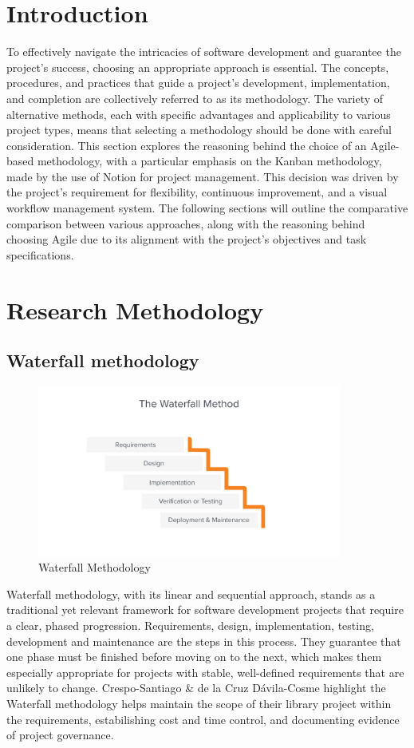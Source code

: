 \section{Introduction}
To effectively navigate the intricacies of software development and guarantee the project's success, choosing an appropriate approach is essential.
The concepts, procedures, and practices that guide a project's development, implementation, and completion are collectively referred to as its methodology.
The variety of alternative methods, each with specific advantages and applicability to various project types, means that selecting a methodology should be done with careful consideration.
This section explores the reasoning behind the choice of an Agile-based methodology, with a particular emphasis on the Kanban methodology, made by the use of Notion for project management.
This decision was driven by the project's requirement for flexibility, continuous improvement, and a visual workflow management system. 
The following sections will outline the comparative comparison between various approaches, along with the reasoning behind choosing Agile due to its alignment with the project's objectives and task specifications.

\section{Research Methodology}
\subsection{Waterfall methodology}
\begin{figure}[!ht]
    \centering
    \includegraphics[width=10cm]{Images/watefall.png}
    \caption{Waterfall Methodology \citep{communitcationteam_2022_waterfall}}
    \label{fig:waterfall}
\end{figure}
Waterfall methodology, with its linear and sequential approach, stands as a traditional yet relevant framework for software development projects that require a clear, phased progression.
Requirements, design, implementation, testing, development and maintenance are the steps in this process.
They guarantee that one phase must be finished before moving on to the next, which makes them especially appropriate for projects with stable, well-defined requirements that are unlikely to change.
Crespo-Santiago \& de la Cruz Dávila-Cosme \citep{cresposantiago_2022_waterfall} highlight the Waterfall methodology helps maintain the scope of their library project within the requirements, estabilishing cost and time control, and documenting evidence of project governance.

